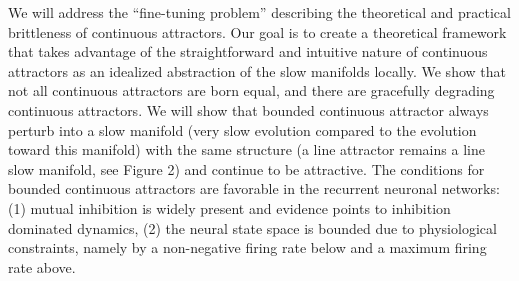 \documentclass[12pt,letterpaper, onecolumn]{article}
\theoremstyle{definition}
\theoremstyle{remark}
\begin{document}



We will address the ``fine-tuning problem'' describing the theoretical and practical brittleness of continuous attractors.
Our goal is to create a theoretical framework that takes advantage of the straightforward and intuitive nature of continuous attractors as an idealized abstraction of the slow manifolds locally.
%
We show that not all continuous attractors are born equal, and there are gracefully degrading continuous attractors.
We will show that bounded continuous attractor always perturb into a slow manifold (very slow evolution compared to the evolution toward this manifold) with the same structure (a line attractor remains a line slow manifold, see Figure 2) and continue to be attractive.
The conditions for bounded continuous attractors are favorable in the recurrent neuronal networks: 
(1) mutual inhibition is widely present and evidence points to inhibition dominated dynamics,
(2) the neural state space is bounded due to physiological constraints, namely by a non-negative firing rate below and a maximum firing rate above.


\end{document}
